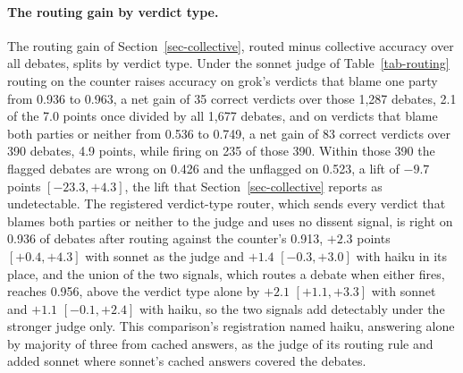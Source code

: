 \paragraph{The routing gain by verdict type.}
The routing gain of Section~\ref{sec-collective}, routed minus collective
accuracy over all debates, splits by verdict type. Under the sonnet judge of
Table~\ref{tab-routing} routing on the counter raises accuracy on grok's verdicts that
blame one party from 0.936 to 0.963, a net gain of 35 correct verdicts over
those 1,287 debates, 2.1 of the 7.0 points once divided by all 1,677
debates, and on verdicts that blame both parties or neither from 0.536 to
0.749, a net gain of 83 correct verdicts over 390 debates, 4.9 points, while
firing on 235 of those 390. Within those 390 the flagged debates are wrong on
0.426 and the unflagged on 0.523, a lift of $-9.7$ points $[-23.3, +4.3]$,
the lift that Section~\ref{sec-collective} reports as undetectable.
The registered verdict-type router, which sends every verdict that blames
both parties or neither to the judge and uses no dissent signal, is right on
0.936 of debates after routing against the counter's 0.913, $+2.3$ points
$[+0.4, +4.3]$ with sonnet as the judge and $+1.4$ $[-0.3, +3.0]$ with haiku
in its place, and the union of the two signals,
which routes a debate when either fires, reaches 0.956, above the verdict
type alone by $+2.1$ $[+1.1, +3.3]$ with sonnet and $+1.1$ $[-0.1, +2.4]$
with haiku, so the two signals add detectably under the stronger judge only.
This comparison's registration named haiku, answering alone by majority of
three from cached answers, as the judge of its routing rule and added sonnet
where sonnet's cached answers covered the debates.
